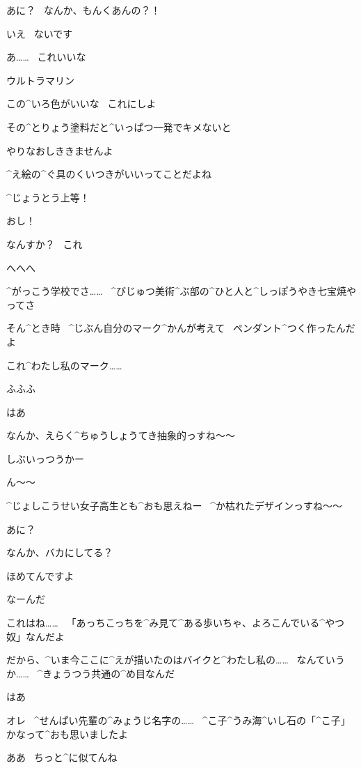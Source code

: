 \Sensei あに？
\ なんか、もんくあんの？！

\Ojisan いえ
\ ないです

\page[143]
\Sensei あ……
\ これいいな

\Sensei ウルトラマリン

\Sensei この^{いろ}{色}がいいな
\ これにしよ

\Ojisan その^{とりょう}{塗料}だと^{いっぱつ}{一発}でキメないと

\Ojisan やりなおしききませんよ

\Sensei ^{え}{絵}の^{ぐ}{具}のくいつきがいいってことだよね

\Sensei ^{じょうとう}{上等}！

\page[144]
\Sensei おし！

\Ojisan なんすか？
\ これ

\Sensei へへへ

\Sensei ^{がっこう}{学校}でさ……
\ ^{びじゅつ}{美術}^{ぶ}{部}の^{ひと}{人}と^{しっぽうやき}{七宝焼}やってさ

\Sensei そん^{とき}{時}
\ ^{じぶん}{自分}のマーク^{かんが}{考}えて
\ ペンダント^{つく}{作}ったんだよ

\Sensei これ^{わたし}{私}のマーク……

\Sensei ふふふ

\Ojisan はあ

\page[145]
\Ojisan なんか、えらく^{ちゅうしょうてき}{抽象的}っすね〜〜

\Ojisan しぶいっつうかー

\Ojisan ん〜〜

\Ojisan ^{じょしこうせい}{女子高生}とも^{おも}{思}えねー
\ ^{か}{枯}れたデザインっすね〜〜

\Sensei あに？

\Sensei なんか、バカにしてる？

\Ojisan ほめてんですよ

\Sensei なーんだ

\page[146]
\Sensei これはね……
\ 「あっちこっちを^{み}{見}て^{ある}{歩}いちゃ、よろこんでいる^{やつ}{奴}」なんだよ

\Sensei だから、^{いま}{今}ここに^{えが}{描}いたのはバイクと^{わたし}{私}の……
\ なんていうか……
\ ^{きょうつう}{共通}の^{め}{目}なんだ

\Ojisan はあ

\page[147]
\Ojisan オレ
\ ^{せんぱい}{先輩}の^{みょうじ}{名字}の……
\ ^{こ}{子}^{うみ}{海}^{いし}{石}の「^{こ}{子}」かなって^{おも}{思}いましたよ

\Sensei ああ
\ ちっと^{に}{似}てんね

